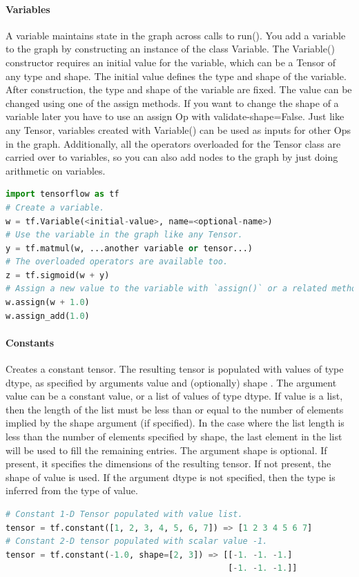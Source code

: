     \paragraph{Variables}
    A variable maintains state in the graph across calls to run(). You add a variable to the graph by constructing an instance of the class Variable.
    The Variable() constructor requires an initial value for the variable, which can be a Tensor of any type and shape. The initial value defines the type and shape of the variable. After construction, the type and shape of the variable are fixed. The value can be changed using one of the assign methods.
    If you want to change the shape of a variable later you have to use an assign Op with validate-shape=False.
    Just like any Tensor, variables created with Variable() can be used as inputs for other Ops in the graph. Additionally, all the operators overloaded for the Tensor class are carried over to variables, so you can also add nodes to the graph by just doing arithmetic on variables.
    \begin{lstlisting}[language=Python]
import tensorflow as tf
# Create a variable.
w = tf.Variable(<initial-value>, name=<optional-name>)
# Use the variable in the graph like any Tensor.
y = tf.matmul(w, ...another variable or tensor...)
# The overloaded operators are available too.
z = tf.sigmoid(w + y)
# Assign a new value to the variable with `assign()` or a related method.
w.assign(w + 1.0)
w.assign_add(1.0)
\end{lstlisting}
\paragraph{Constants}
Creates a constant tensor.
The resulting tensor is populated with values of type dtype, as specified by arguments value and (optionally) shape .
The argument value can be a constant value, or a list of values of type dtype. If value is a list, then the length of the list must be less than or equal to the number of elements implied by the shape argument (if specified). In the case where the list length is less than the number of elements specified by shape, the last element in the list will be used to fill the remaining entries.
The argument shape is optional. If present, it specifies the dimensions of the resulting tensor. If not present, the shape of value is used.
If the argument dtype is not specified, then the type is inferred from the type of value.
\begin{lstlisting}[language=Python]
# Constant 1-D Tensor populated with value list.
tensor = tf.constant([1, 2, 3, 4, 5, 6, 7]) => [1 2 3 4 5 6 7]
# Constant 2-D tensor populated with scalar value -1.
tensor = tf.constant(-1.0, shape=[2, 3]) => [[-1. -1. -1.]
                                             [-1. -1. -1.]]

\end{lstlisting}
